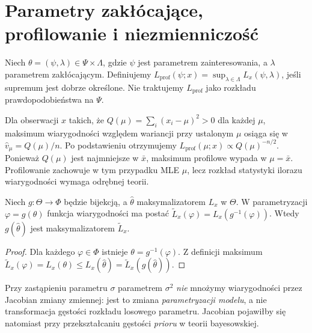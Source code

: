 \section{Parametry zakłócające, profilowanie i niezmienniczość}
\begin{definicja}
Niech $\theta=(\psi,\lambda)\in\Psi\times\Lambda$, gdzie $\psi$ jest
parametrem zainteresowania, a $\lambda$ parametrem zakłócającym.
Definiujemy $L_{\mathrm{prof}}(\psi;x)=\sup_{\lambda\in\Lambda}
L_x(\psi,\lambda)$, jeśli supremum jest dobrze określone.
Nie traktujemy $L_{\mathrm{prof}}$ jako rozkładu prawdopodobieństwa na $\Psi$.
\end{definicja}

\begin{przyklad}
Dla obserwacji $x$ takich, że $Q(\mu)=\sum_i(x_i-\mu)^2>0$
dla każdej $\mu$, maksimum wiarygodności względem wariancji przy ustalonym
$\mu$ osiąga się w $\widehat v_\mu=Q(\mu)/n$. Po podstawieniu
otrzymujemy $L_{\mathrm{prof}}(\mu;x)\propto Q(\mu)^{-n/2}$.
Ponieważ $Q(\mu)$ jest najmniejsze w $\bar x$, maksimum profilowe
wypada w $\mu=\bar x$. Profilowanie zachowuje w tym przypadku MLE $\mu$,
lecz rozkład statystyki ilorazu wiarygodności wymaga odrębnej teorii.
\end{przyklad}

\begin{stwierdzenie}
Niech $g:\Theta\to\Phi$ będzie bijekcją, a $\widehat\theta$ maksymalizatorem
$L_x$ w $\Theta$. W parametryzacji $\varphi=g(\theta)$ funkcja wiarygodności
ma postać $\widetilde L_x(\varphi)=L_x(g^{-1}(\varphi))$.
Wtedy $g(\widehat\theta)$ jest maksymalizatorem $\widetilde L_x$.
\end{stwierdzenie}
\begin{proof}
Dla każdego $\varphi\in\Phi$ istnieje $\theta=g^{-1}(\varphi)$.
Z definicji maksimum
$\widetilde L_x(\varphi)=L_x(\theta)\le L_x(\widehat\theta)
=\widetilde L_x(g(\widehat\theta))$.
\end{proof}

\begin{uwaga}
Przy zastąpieniu parametru $\sigma$ parametrem $\sigma^2$ \emph{nie}
mnożymy wiarygodności przez Jacobian zmiany zmiennej: jest to zmiana
\emph{parametryzacji modelu}, a nie transformacja gęstości rozkładu
losowego parametru. Jacobian pojawiłby się natomiast przy przekształcaniu
gęstości \emph{prioru} w teorii bayesowskiej.
\end{uwaga}

